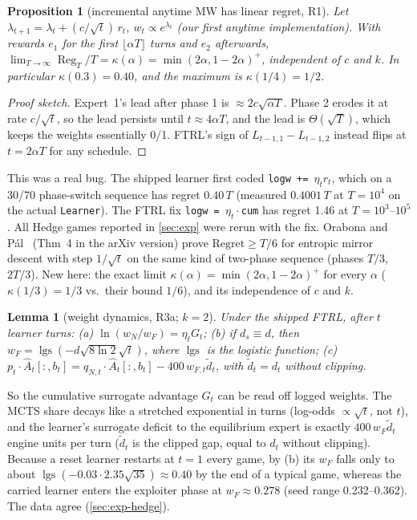 \documentclass[10pt]{article}
\theoremstyle{plain}
\newtheorem{lemma}[theorem]{Lemma}
\newtheorem{proposition}[theorem]{Proposition}
\theoremstyle{definition}
\theoremstyle{remark}
\newcommand{\Ahat}{\hat A}
\DeclareMathOperator{\Reg}{Reg}
\DeclareMathOperator{\lgs}{lgs}
\begin{document}
\begin{proposition}[incremental anytime MW has linear regret, R1]\label{prop:R1}
Let $\lambda_{t+1}=\lambda_t+(c/\sqrt t)\,r_t$, $w_t\propto e^{\lambda_t}$ (our first anytime implementation). With rewards $e_1$ for the first $\lfloor\alpha T\rfloor$ turns and $e_2$ afterwards,
$\lim_{T\to\infty}\Reg_T/T=\kappa(\alpha)=\min(2\alpha,1-2\alpha)^+$, independent of $c$ and $k$. In particular $\kappa(0.3)=0.40$, and the maximum is $\kappa(1/4)=1/2$.
\end{proposition}
\begin{proof}[Proof sketch]
Expert~1's lead after phase 1 is $\approx2c\sqrt{\alpha T}$. Phase 2 erodes it at rate $c/\sqrt t$, so the lead persists until $t\approx4\alpha T$, and the lead is $\Theta(\sqrt T)$, which keeps the weights essentially 0/1. FTRL's sign of $L_{t-1,1}-L_{t-1,2}$ instead flips at $t=2\alpha T$ for any schedule.
\end{proof}
This was a real bug. The shipped learner first coded \texttt{logw += $\eta_t r_t$}, which on a 30/70 phase-switch sequence has regret $0.40\,T$ (measured $0.4001\,T$ at $T=10^4$ on the actual \texttt{Learner}). The FTRL fix \texttt{logw = $\eta_t\cdot$cum} has regret 1.46 at $T=10^3$--$10^5$. All Hedge games reported in \cref{sec:exp} were rerun with the fix. Orabona and P\'al~\cite{OP18} (Thm~4 in the arXiv version) prove $\mathrm{Regret}\ge T/6$ for entropic mirror descent with step $1/\sqrt t$ on the same kind of two-phase sequence (phases $T/3$, $2T/3$). New here: the exact limit $\kappa(\alpha)=\min(2\alpha,1-2\alpha)^+$ for every $\alpha$ ($\kappa(1/3)=1/3$ vs.\ their bound $1/6$), and its independence of $c$ and $k$.

\begin{lemma}[weight dynamics, R3a; $k=2$]\label{lem:R3}
Under the shipped FTRL, after $t$ learner turns: (a) $\ln(w_N/w_F)=\eta_tG_t$; (b) if $d_s\equiv d$, then $w_F=\lgs(-d\sqrt{8\ln2}\sqrt t)$, where $\lgs$ is the logistic function; (c) $p_t\cdot\Ahat_t[:,b_t]=q_{N,t}\cdot\Ahat_t[:,b_t]-400\,w_{F,t}\tilde d_t$, with $\tilde d_t=d_t$ without clipping.
\end{lemma}
So the cumulative surrogate advantage $G_t$ can be read off logged weights. The MCTS share decays like a stretched exponential in turns (log-odds $\propto\sqrt t$, not $t$), and the learner's surrogate deficit to the equilibrium expert is exactly $400\,w_F\tilde d_t$ engine units per turn ($\tilde d_t$ is the clipped gap, equal to $d_t$ without clipping). Because a reset learner restarts at $t=1$ every game, by (b) its $w_F$ falls only to about $\lgs(-0.03\cdot2.35\sqrt{35})\approx0.40$ by the end of a typical game, whereas the carried learner enters the exploiter phase at $w_F\approx0.278$ (seed range 0.232--0.362). The data agree (\cref{sec:exp-hedge}).
\end{document}
